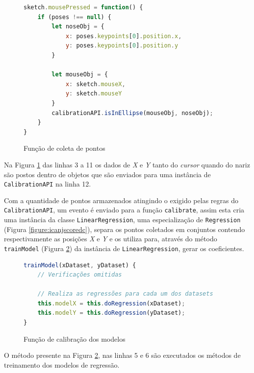 \begin{figure}[H]
    \centering
    \caption{Função de coleta de pontos}
    \begin{lstlisting}[language=JavaScript]
sketch.mousePressed = function() {
    if (poses !== null) {
        let noseObj = {
            x: poses.keypoints[0].position.x,
            y: poses.keypoints[0].position.y
        }
        
        let mouseObj = {
            x: sketch.mouseX,
            y: sketch.mouseY
        }
        calibrationAPI.isInEllipse(mouseObj, noseObj);
    }
}
    \end{lstlisting}
    \label{figure:funcao_coleta_de_pontos_calibracao}
\end{figure}

\par Na Figura \ref{figure:funcao_coleta_de_pontos_calibracao} das linhas 3 a 11 os dados de \textit{X} e \textit{Y} tanto do \textit{cursor} quando do nariz são postos dentro de objetos que são enviados para uma instância de \texttt{CalibrationAPI} na linha 12.

\par Com a quantidade de pontos armazenados atingindo o exigido pelas regras do \texttt{CalibrationAPI}, um evento é enviado para a função \texttt{calibrate}, assim esta cria uma instância da classe \texttt{LinearRegression}, uma especialização de \texttt{Regression} (Figura \ref{figure:icanjscoredc}), separa os pontos coletados em conjuntos contendo respectivamente as posições \textit{X} e \textit{Y} e os utiliza para, através do método \texttt{trainModel} (Figura \ref{figure:funcao_calibracao_modelo_de_regressao}) da instância de \texttt{LinearRegression}, gerar os coeficientes.

\begin{figure}[H]
    \centering
    \caption{Função de calibração dos modelos}
    \begin{lstlisting}[language=JavaScript]
trainModel(xDataset, yDataset) {
    // Verificações omitidas

    // Realiza as regressões para cada um dos datasets
    this.modelX = this.doRegression(xDataset);
    this.modelY = this.doRegression(yDataset);
}
    \end{lstlisting}
    \label{figure:funcao_calibracao_modelo_de_regressao}
\end{figure}

\par O método presente na Figura \ref{figure:funcao_calibracao_modelo_de_regressao}, nas linhas 5 e 6 são executados os métodos de treinamento dos modelos de regressão.

